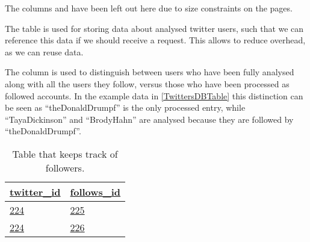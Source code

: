 The columns  and  have been left out here
due to size constraints on the pages.

\begin{table}[H]
\centering
{}
\caption{Table containing twitter users and their determined values.}
\label{TwittersDBTable}
\end{table}

The table  is used for storing data about analysed
twitter users, such that we can reference this data if we should receive
a request. This allows to reduce overhead, as we can reuse data. \nl

The  column is used to distinguish between users who have been
fully analysed along with all the users they follow, versus those who have been
processed as followed accounts. In the example data in \autoref{TwittersDBTable}
this distinction can be seen as ``theDonaldDrumpf'' is the only processed entry,
while ``TayaDickinson'' and ``BrodyHahn'' are analysed because they are followed
by ``theDonaldDrumpf''.

\begin{table}[H]
\centering
\begin{tabular}{| l | l |}
\hline
\textbf{\underline{twitter\_id}} & \textbf{\underline{follows\_id}} \\
\hline
\underline{224} & \underline{225} \\
\hline
\underline{224} & \underline{226} \\
\hline
\end{tabular}
\caption{Table that keeps track of followers.}
\label{TwitterTwitterDBTable}
\end{table}

